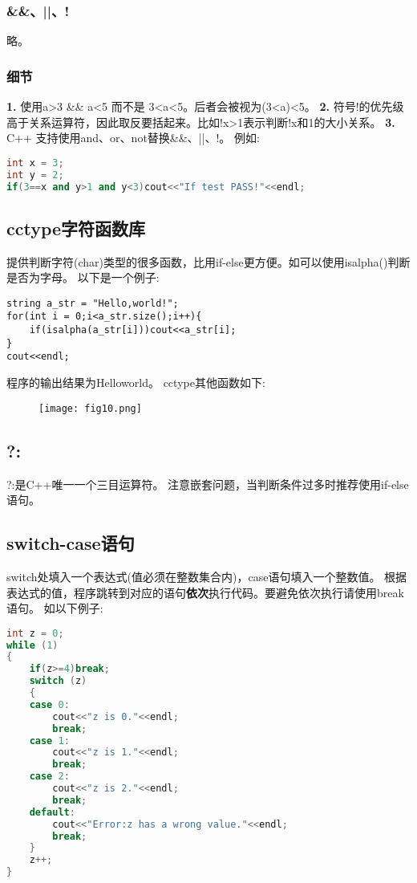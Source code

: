 \documentclass{article}
\begin{document}
    \subsubsection{\&\&、||、!}
    略。
    \subsubsection{细节}
    \textbf{1.}
    使用a>3 \&\& a<5 而不是 3<a<5。后者会被视为(3<a)<5。
    \textbf{2.}
    符号!的优先级高于关系运算符，因此取反要括起来。比如!x>1表示判断!x和1的大小关系。
    \textbf{3.} 
    C++ 支持使用and、or、not替换\&\&、||、!。
    例如:
    \begin{lstlisting}[language=c++]
int x = 3;
int y = 2;
if(3==x and y>1 and y<3)cout<<"If test PASS!"<<endl;
    \end{lstlisting}

    \subsection{cctype字符函数库}
    提供判断字符(char)类型的很多函数，比用if-else更方便。如可以使用isalpha()判断是否为字母。
    以下是一个例子:
    \begin{lstlisting}
string a_str = "Hello,world!";
for(int i = 0;i<a_str.size();i++){
    if(isalpha(a_str[i]))cout<<a_str[i];
}
cout<<endl;
    \end{lstlisting}
    程序的输出结果为Helloworld。
    cctype其他函数如下:
    \begin{figure}[H]
        \centering
        \texttt{[image: fig10.png]}
    \end{figure}
    
    \subsection{?:}
    ?:是C++唯一一个三目运算符。
    注意嵌套问题，当判断条件过多时推荐使用if-else语句。

    \subsection{switch-case语句}
    switch处填入一个表达式(值必须在整数集合内)，case语句填入一个整数值。
    根据表达式的值，程序跳转到对应的语句\textbf{依次}执行代码。要避免依次执行请使用break语句。
    如以下例子:
    \begin{lstlisting}[language=c++]
int z = 0;
while (1)
{
    if(z>=4)break;
    switch (z)
    {
    case 0:
        cout<<"z is 0."<<endl;
        break;
    case 1:
        cout<<"z is 1."<<endl;
        break;
    case 2:
        cout<<"z is 2."<<endl;
        break;
    default:
        cout<<"Error:z has a wrong value."<<endl;
        break;
    }
    z++;
}
    \end{lstlisting}
\end{document}

